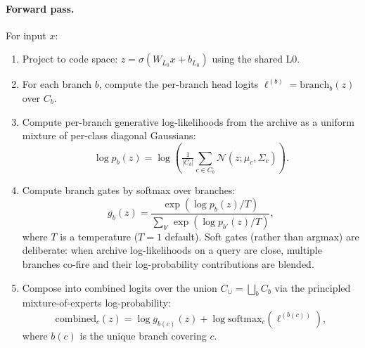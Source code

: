 \documentclass[11pt]{article}
\begin{document}
\paragraph{Forward pass.}
For input $x$:
\begin{enumerate}[leftmargin=2em]
  \item Project to code space:
        $z = \sigma(W_{L_0} x + b_{L_0})$ using the shared L0.
  \item For each branch $b$, compute the per-branch head logits
        $\ell^{(b)} = \text{branch}_b(z)$ over $C_b$.
  \item Compute per-branch generative log-likelihoods from the archive
        as a uniform mixture of per-class diagonal Gaussians:
        $$\log p_b(z) = \log\!\left(
          \tfrac{1}{|C_b|}
          \sum_{c \in C_b} \mathcal{N}(z;\mu_c, \Sigma_c)
        \right).$$
  \item Compute branch gates by softmax over branches:
        $$g_b(z) = \frac{\exp(\log p_b(z) / T)}
                       {\sum_{b'} \exp(\log p_{b'}(z) / T)},$$
        where $T$ is a temperature ($T = 1$ default). Soft gates
        (rather than argmax) are deliberate: when archive
        log-likelihoods on a query are close, multiple branches
        co-fire and their log-probability contributions are blended.
  \item Compose into combined logits over the union
        $C_{\cup} = \bigsqcup_b C_b$ via the principled
        mixture-of-experts log-probability:
        $$\text{combined}_c(z) = \log g_{b(c)}(z) +
          \log\text{softmax}_c(\ell^{(b(c))}),$$
        where $b(c)$ is the unique branch covering $c$.
\end{enumerate}
\end{document}
